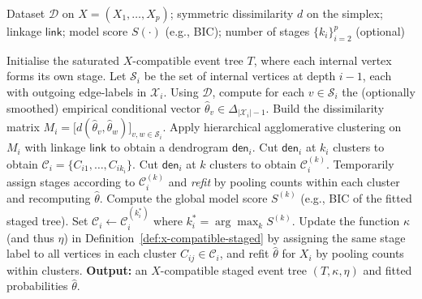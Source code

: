 \documentclass[preprint,12pt]{elsarticle}
\begin{document}
\begin{algorithm}
\caption{Learning Stage Structure via Hierarchical Clustering}
\label{alg:hc-stages}
\begin{algorithmic}[1]
\Require Dataset $\mathcal{D}$ on $X=(X_1,\dots,X_p)$; symmetric dissimilarity $d$ on the simplex; linkage $\mathsf{link}$; model score $S(\cdot)$ (e.g., BIC);
number of stages $\{k_i\}_{i=2}^p$ (optional)

\State Initialise the saturated $X$-compatible event tree $T$, where each internal vertex forms its own stage.
  \State Let $\mathcal{S}_i$ be the set of internal vertices at depth $i-1$, each with outgoing edge-labels in  $\mathcal{X}_i$.
  \State Using $\mathcal{D}$, compute for each $v\in\mathcal{S}_i$ the (optionally smoothed) empirical conditional vector $\hat{\theta}_v\in\Delta_{|\mathcal{X}_i|-1}$.
  \State Build the dissimilarity matrix $M_i=\bigl[d(\hat{\theta}_v,\hat{\theta}_w)\bigr]_{v,w\in\mathcal{S}_i}$.
  \State Apply hierarchical agglomerative clustering on $M_i$ with linkage $\mathsf{link}$ to obtain a dendrogram $\mathsf{den}_i$.
      \State Cut $\mathsf{den}_i$ at $k_i$ clusters to obtain $\mathcal{C}_i=\{C_{i1},\dots,C_{ik_i}\}$.
  \Else
          \State Cut $\mathsf{den}_i$ at $k$ clusters to obtain $\mathcal{C}_i^{(k)}$.
          \State Temporarily assign stages according to $\mathcal{C}_i^{(k)}$ and \emph{refit} by pooling counts within each cluster and recomputing $\hat{\theta}$.
          \State Compute the global model score $S^{(k)}$ (e.g., BIC of the fitted staged tree).
      \EndFor
      \State Set $\mathcal{C}_i \gets \mathcal{C}_i^{(k_i^*)}$ where $k_i^*=\arg\max_k S^{(k)}$.
  \EndIf
  \State Update the function $\kappa$ (and thus $\eta$) in Definition~\ref{def:x-compatible-staged} by assigning the same stage label to all vertices in each cluster $C_{ij}\in\mathcal{C}_i$, and refit $\hat{\theta}$ for $X_i$ by pooling counts within clusters.
\EndFor
\State \textbf{Output:} an $X$-compatible staged event tree $(T,\kappa,\eta)$ and fitted probabilities $\hat{\theta}$.
\end{algorithmic}
\end{algorithm}
\end{document}
